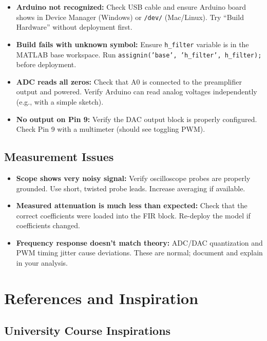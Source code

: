 \documentclass[11pt,letterpaper]{article}
\begin{document}
\begin{itemize}
    \item \textbf{Arduino not recognized:} Check USB cable and ensure Arduino board shows in Device Manager (Windows) or \texttt{/dev/} (Mac/Linux). Try ``Build Hardware'' without deployment first.
    \item \textbf{Build fails with unknown symbol:} Ensure \texttt{h\_filter} variable is in the MATLAB base workspace. Run \texttt{assignin('base', 'h\_filter', h\_filter);} before deployment.
    \item \textbf{ADC reads all zeros:} Check that A0 is connected to the preamplifier output and powered. Verify Arduino can read analog voltages independently (e.g., with a simple sketch).
    \item \textbf{No output on Pin 9:} Verify the DAC output block is properly configured. Check Pin 9 with a multimeter (should see toggling PWM).
\end{itemize}

\subsection{Measurement Issues}

\begin{itemize}
    \item \textbf{Scope shows very noisy signal:} Verify oscilloscope probes are properly grounded. Use short, twisted probe leads. Increase averaging if available.
    \item \textbf{Measured attenuation is much less than expected:} Check that the correct coefficients were loaded into the FIR block. Re-deploy the model if coefficients changed.
    \item \textbf{Frequency response doesn't match theory:} ADC/DAC quantization and PWM timing jitter cause deviations. These are normal; document and explain in your analysis.
\end{itemize}

\clearpage

\section*{References and Inspiration}

\subsection*{University Course Inspirations}
\end{document}
